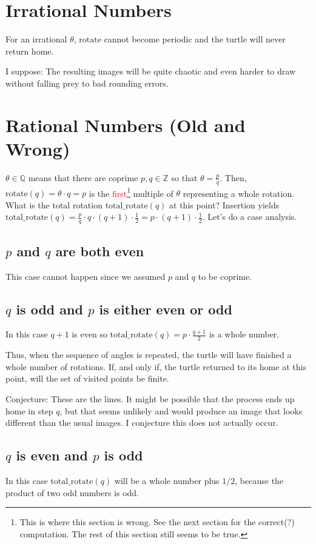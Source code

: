 \documentclass[pdftex,a4paper]{scrartcl}
\newcommand{\rotate}{\text{rotate}}
\newcommand{\total}{\text{total\_rotate}}
\begin{document}
\section{Irrational Numbers}
For an irrational \(\theta\), \(\rotate\) cannot become periodic and the turtle will never return home.

I suppose: The resulting images will be quite chaotic and even harder to draw without falling prey to bad rounding
errors.

\section{Rational Numbers (Old and Wrong)}
\(\theta\in\mathbb{Q}\) means that there are coprime \(p,q\in\mathbb{Z}\) so that \(\theta=\frac{p}{q}\). Then,
\(\rotate(q)=\theta\cdot q=p\) is the \textcolor{red}{first}\footnote{This is where this section is wrong. See the next
section for the correct(?) computation. The rest of this section still seems to be true.} multiple of \(\theta\)
representing a whole rotation. What is the total
rotation \(\total(q)\) at this point? Insertion yields \(\total(q)=\frac{p}{q}\cdot q\cdot(q+1)\cdot \frac{1}{2}
=p\cdot(q+1)\cdot\frac{1}{2}\).
Let's do a case analysis.

\subsection{$p$ and $q$ are both even}
This case cannot happen since we assumed \(p\) and \(q\) to be coprime.

\subsection{$q$ is odd and $p$ is either even or odd}
In this case \(q+1\) is even so \(\total(q)=p\cdot\frac{q+1}{2}\) is a whole number.

Thus, when the sequence of angles is repeated, the turtle will have finished a whole number of rotations. If, and only
if, the turtle returned to its home at this point, will the set of visited points be finite.

Conjecture: These are the lines. It might be possible that the process ends up home in step \(q\), but that seems
unlikely and would produce an image that looks different than the usual images. I conjecture this does not actually
occur.

\subsection{$q$ is even and $p$ is odd}
In this case \(\total(q)\) will be a whole number plus \(1/2\), because the product of two odd numbers is odd.
\end{document}
